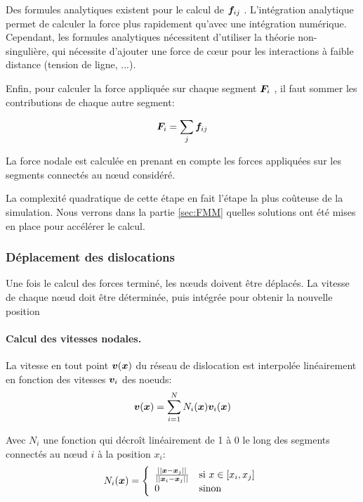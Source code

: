 \documentclass[11pt,class=article,float=false,crop=false]{standalone}
\begin{document}
Des formules analytiques existent pour le calcul de $\bm{f}_{ij}$ . L'intégration analytique permet de calculer la force plus rapidement qu'avec une intégration numérique. Cependant, les formules analytiques nécessitent d'utiliser la théorie non-singulière, qui nécessite d'ajouter une force de cœur pour les interactions à faible distance (tension de ligne, ...).

Enfin, pour calculer la force appliquée sur chaque segment $\bm{F}_i$ , il faut sommer les contributions de chaque autre segment:

\begin{equation}
\bm{F}_i = \sum_{j} \bm{f}_{ij}
\label{eq:force_nodale}
\end{equation}

La force nodale est calculée en prenant en compte les forces appliquées sur les segments connectés au nœud considéré.

La complexité quadratique de cette étape en fait l'étape la plus coûteuse de la simulation. Nous verrons dans la partie \ref{sec:FMM} quelles solutions ont été mises en place pour accélérer le calcul.


\subsubsection{Déplacement des dislocations}

Une fois le calcul des forces terminé, les nœuds doivent être déplacés. La vitesse de chaque nœud doit être déterminée, puis intégrée pour obtenir la nouvelle position

\paragraph{Calcul des vitesses nodales.}

La vitesse en tout point $\bm{v}(\bm{x})$ du réseau de dislocation est interpolée linéairement en fonction des vitesses $\bm{v}_i$ des noeuds:
\begin{equation}
\bm{v}(\bm{x})  = \sum_{i=1}^N N_i(\bm{x}) \bm{v}_i(\bm{x})
\label{eq:mobility_interp}
\end{equation}

Avec $N_i$ une fonction qui décroît linéairement de 1 à 0 le long des segments connectés au nœud $i$ à la position $x_i$:
\begin{equation}
N_i(\bm{x}) = \left\{
\begin{array}{ll}
\frac{||\bm{x} - \bm{x}_j||}{||\bm{x}_i-\bm{x}_j||} & \text{si } x \in [x_i,x_j] \\
0 															& \text{sinon}\\
\end{array}
\right. 
\end{equation}
\end{document}
